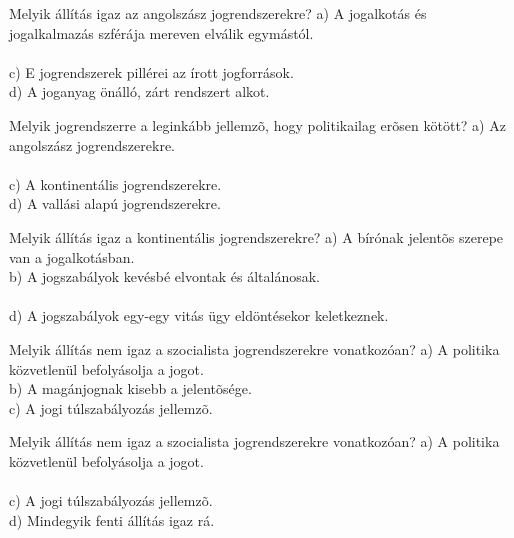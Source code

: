 \begin{frame}

\begin{tcolorbox}[title={13. Kérdés}]
Melyik állítás igaz az angolszász jogrendszerekre?
\tcblower
a) A jogalkotás és jogalkalmazás szférája mereven elválik egymástól.\\
\\
c) E jogrendszerek pillérei az írott jogforrások.\\
d) A joganyag önálló, zárt rendszert alkot.
\end{tcolorbox}

\begin{tcolorbox}[title={14. Kérdés}]
Melyik jogrendszerre a leginkább jellemzõ, hogy politikailag erõsen kötött?
\tcblower
a) Az angolszász jogrendszerekre.\\
\\
c) A kontinentális jogrendszerekre.\\
d) A vallási alapú jogrendszerekre.
\end{tcolorbox}

\begin{tcolorbox}[title={15. Kérdés}]
Melyik állítás igaz a kontinentális jogrendszerekre?
\tcblower
a) A bírónak jelentõs szerepe van a jogalkotásban.\\
b) A jogszabályok kevésbé elvontak és általánosak.\\
\\
d) A jogszabályok egy-egy vitás ügy eldöntésekor keletkeznek.
\end{tcolorbox}

\begin{tcolorbox}[title={16. Kérdés}]
Melyik állítás nem igaz a szocialista jogrendszerekre vonatkozóan?
\tcblower
a) A politika közvetlenül befolyásolja a jogot.\\
b) A magánjognak kisebb a jelentõsége.\\
c) A jogi túlszabályozás jellemzõ.\\
\end{tcolorbox}

\end{frame}


\begin{frame}

\begin{tcolorbox}[title={17. Kérdés}]
Melyik állítás nem igaz a szocialista jogrendszerekre vonatkozóan?
\tcblower
a) A politika közvetlenül befolyásolja a jogot.\\
\\
c) A jogi túlszabályozás jellemzõ.\\
d) Mindegyik fenti állítás igaz rá.
\end{tcolorbox}

\end{frame}

